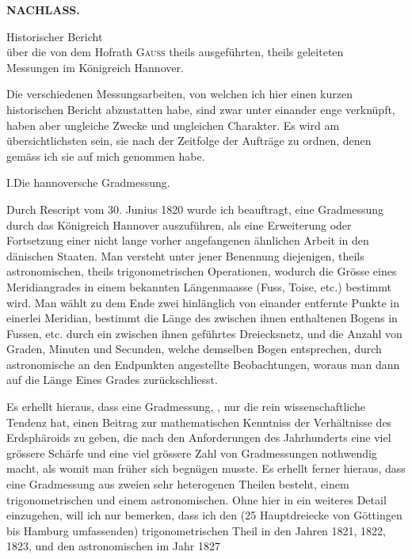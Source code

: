 \noindent{}\hfill{\small\textbf{NACHLASS.}}\hfill\null\par\medskip

\begin{center}
Historischer Bericht\\
über die von dem Hofrath \textsc{Gauss} theils ausgeführten, theils geleiteten\\
Messungen im Königreich Hannover.
\end{center}

\par\noindent\hspace*{\parindent}Die verschiedenen Messungsarbeiten, von welchen ich hier einen kurzen historischen Bericht abzustatten habe, sind zwar unter einander enge verknüpft, haben aber ungleiche Zwecke und ungleichen Charakter. Es wird am übersichtlichsten sein, sie nach der Zeitfolge der Aufträge zu ordnen, denen gemäss ich sie auf mich genommen habe.

\par\medskip
\begin{center}
I.\quad Die hannoversche Gradmessung.
\end{center}

\par\noindent\hspace*{\parindent}Durch Rescript vom 30. Junius 1820 wurde ich beauftragt, eine Gradmessung durch das Königreich Hannover auszuführen, als eine Erweiterung oder Fortsetzung einer nicht lange vorher angefangenen ähnlichen Arbeit in den dänischen Staaten. Man versteht unter jener Benennung diejenigen, theils astronomischen, theils trigonometrischen Operationen, wodurch die Grösse eines Meridiangrades in einem bekannten Längenmaasse (Fuss, Toise, etc.) bestimmt wird. Man wählt zu dem Ende zwei hinlänglich von einander entfernte Punkte in einerlei Meridian, bestimmt die Länge des zwischen ihnen enthaltenen Bogens in Fussen, etc. durch ein zwischen ihnen geführtes Dreiecksnetz, und die Anzahl von Graden, Minuten und Secunden, welche demselben Bogen entsprechen, durch astronomische an den Endpunkten angestellte Beobachtungen, woraus man dann auf die Länge Eines Grades zurückschliesst.

\par\noindent\hspace*{\parindent}Es erhellt hieraus, dass eine Gradmessung, , nur die rein wissenschaftliche Tendenz hat, einen Beitrag zur mathematischen Kenntniss der Verhältnisse des Erdsphäroids zu geben, die nach den Anforderungen des Jahrhunderts eine viel grössere Schärfe und eine viel grössere Zahl von Gradmessungen nothwendig macht, als womit man früher sich begnügen musste. Es erhellt ferner hieraus, dass eine Gradmessung aus zweien sehr heterogenen Theilen besteht, einem trigonometrischen und einem astronomischen. Ohne hier in ein weiteres Detail einzugehen, will ich nur bemerken, dass ich den (25 Hauptdreiecke von Göttingen bis Hamburg umfassenden) trigonometrischen Theil in den Jahren 1821, 1822, 1823, und den astronomischen im Jahr 1827

